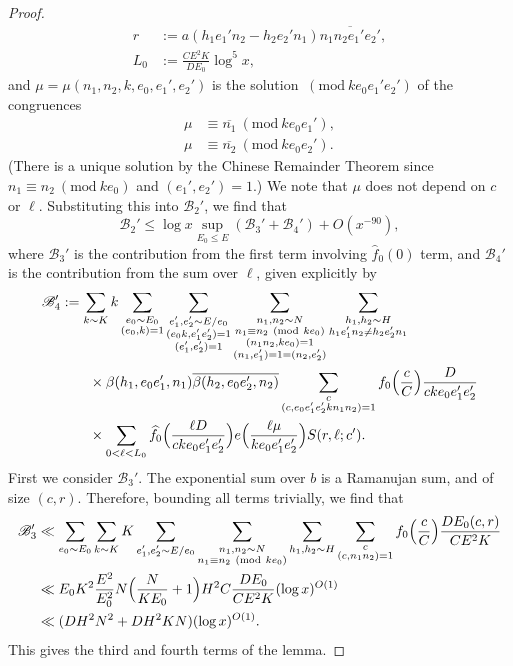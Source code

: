 \documentclass[10pt]{amsart}
\theoremstyle{plain}
\numberwithin{equation}{section}
\newcommand{\Mod}[1]{\ (\mathrm{mod}\ #1)}
\renewcommand{\hat}[1]{\widehat #1}
\begin{document}
\begin{proof}
\begin{align*}
r&:=a (h_1e_1'n_2-h_2e_2'n_1)\overline{n_1n_2e_1'e_2'},\\
L_0&:=\frac{C E^2 K}{D E_0}\log^5{x},
\end{align*}
and $\mu=\mu(n_1,n_2,k,e_0,e_1',e_2')$ is the solution $\Mod{ke_0e_1'e_2'}$ of the congruences
\begin{align*}
\mu&\equiv \overline{n_1}\Mod{ke_0e_1'},\\
\mu&\equiv \overline{n_2}\Mod{ke_0e_2'}.
\end{align*}
(There is a unique solution by the Chinese Remainder Theorem since $n_1\equiv n_2\Mod{ke_0}$ and $(e_1',e_2')=1$.) We note that $\mu$ does not depend on $c$ or $\ell$. Substituting this into $\mathscr{B}_2'$, we find that
\[
\mathscr{B}_2'\le \log{x}\sup_{E_0\le E}(\mathscr{B}_3'+\mathscr{B}_4')+O(x^{-90}),
\]
where $\mathscr{B}_3'$ is the contribution from the first term involving $\hat{f}_0(0)$ term, and $\mathscr{B}_4'$ is the contribution from the sum over $\ell$, given explicitly by
\begin{align*}
\mathscr{B}_4'&:=
\sum_{\substack{k\sim K}}k\sum_{\substack{e_0\sim E_0\\ (e_0,k)=1}}\sum_{\substack{e_1',e_2'\sim E/e_0\\ (e_0k,e_1'e_2')=1\\(e_1',e_2')=1}}\sum_{\substack{n_1,n_2\sim N\\ n_1\equiv n_2\Mod{k e_0}\\ (n_1n_2, k e_0)=1\\ (n_1,e_1')=1=(n_2,e_2')}}\sum_{\substack{h_1,h_2\sim H\\ h_1e_1'n_2\ne h_2e_2'n_1}}\\
&\qquad\times\beta(h_1,e_0e_1',n_1)\overline{\beta(h_2,e_0e_2',n_2)}\sum_{\substack{c\\ (c,e_0 e_1'e_2' k n_1n_2)=1}}f_0\Bigl(\frac{c}{C}\Bigr)\frac{D}{c k e_0e_1'e_2'}\\
&\qquad\times\sum_{0<\ell<L_0}\hat{f_0}\Bigl(\frac{\ell D}{c k e_0e_1'e_2'}\Bigr)e\Bigl(\frac{\ell\mu}{k e_0e_1'e_2'}\Bigr)S(r,\ell;c').
\end{align*}
 First we consider $\mathscr{B}_3'$. The exponential sum over $b$ is a Ramanujan sum, and of size $(c,r)$. Therefore, bounding all terms trivially, we find that
\begin{align*}
\mathscr{B}_3'&\ll \sum_{e_0\sim E_0}\sum_{\substack{k\sim K}}K\sum_{\substack{e_1',e_2'\sim E/e_0}}\sum_{\substack{n_1,n_2\sim N\\ n_1\equiv n_2\Mod{k e_0}}}\sum_{h_1,h_2\sim H}\sum_{\substack{c\\ (c,n_1n_2)=1}}f_0\Bigl(\frac{c}{C}\Bigr)\frac{D E_0 (c,r)}{C E^2 K}\\
&\ll E_0 K^2 \frac{E^2}{E_0^2} N\Bigl(\frac{N}{K E_0}+1\Bigr) H^2 C \frac{D E_0}{C E^2 K}(\log{x})^{O(1)}\\
&\ll ( D H^2 N^2+D H^2 K N) (\log{x})^{O(1)}.
\end{align*}
This gives the third and fourth terms of the lemma. 


\end{proof}
\end{document}
